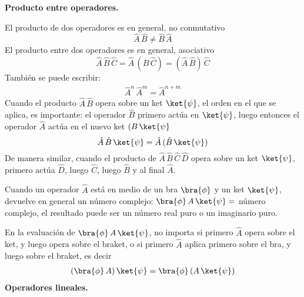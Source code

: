 \textbf{Producto entre operadores.}

El producto de dos operadores es en general, no conmutativo
\begin{equation}
\hat{A} \, \hat{B} \neq \hat{B} \, \hat{A}
\label{eq:ecuacion_02_53}
\end{equation}
El producto entre dos operadores es en general, asociativo
\begin{equation}
\hat{A} \, \hat{B} \, \hat{C} =  \hat{A} \, (\hat{B} \, \hat{C}) = (\hat{A} \, \hat{B}) \, \hat{C} 
\label{eq:ecuacion_02_54}
\end{equation}
También se puede escribir:
\begin{align*}
\hat{A}^{n} \, \hat{A}^{m} = \hat{A}^{n + m}
\end{align*}
Cuando el producto $\hat{A} \, \hat{B}$ opera sobre un ket $\ket{\psi}$, el orden en el que se aplica, es importante: el operador $\hat{B}$ primero actúa en $\ket{\psi}$, luego entonces el operador $\hat{A}$ actúa en el nuevo ket $(B \, \ket{\psi}$
\begin{equation}
\hat{A} \, \hat{B} \, \ket{\psi} = \hat{A} \, (\hat{B} \, \ket{\psi})
\label{eq:ecuacion_02_55}
\end{equation}
De manera similar, cuando el producto de $\hat{A} \, \hat{B} \, \hat{C} \, \hat{D}$ opera sobre un ket $\ket{\psi}$, primero actúa $\hat{D}$, luego $\hat{C}$, luego $\hat{B}$ y al final $\hat{A}$.
\par
Cuando un operador $\hat{A}$ está en medio de un bra $\bra{\phi}$ y un ket $\ket{\psi}$, devuelve en general un número complejo: $\bra{\phi} \, A \, \ket{\psi} =$ número complejo, el resultado puede ser un número real puro o un imaginario puro.
\par
En la evaluación de $\bra{\phi} \, A \, \ket{\psi}$, no importa si primero $\hat{A}$ opera sobre el ket, y luego opera sobre el braket, o si primero $\hat{A}$ aplica primero sobre el bra, y luego sobre el braket, es decir
\begin{align*}
(\bra{\phi} \, A) \, \ket{\psi} = \bra{\phi} \, (A \, \ket{\psi})
\end{align*}
\textbf{Operadores lineales.}

